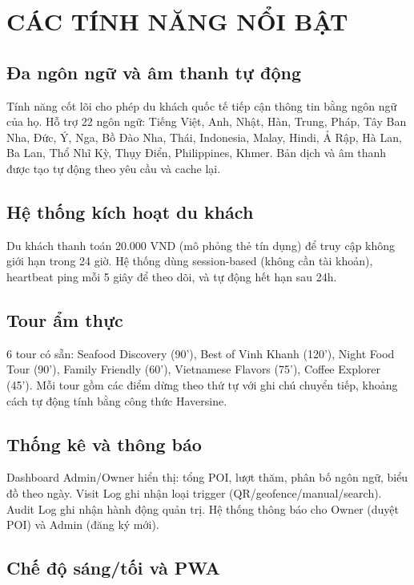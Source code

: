 \documentclass[a4paper,13pt]{report}
\begin{document}
\chapter{CÁC TÍNH NĂNG NỔI BẬT}

\section{Đa ngôn ngữ và âm thanh tự động}

Tính năng cốt lõi cho phép du khách quốc tế tiếp cận thông tin bằng ngôn ngữ của họ. Hỗ trợ 22 ngôn ngữ: Tiếng Việt, Anh, Nhật, Hàn, Trung, Pháp, Tây Ban Nha, Đức, Ý, Nga, Bồ Đào Nha, Thái, Indonesia, Malay, Hindi, Ả Rập, Hà Lan, Ba Lan, Thổ Nhĩ Kỳ, Thụy Điển, Philippines, Khmer. Bản dịch và âm thanh được tạo tự động theo yêu cầu và cache lại.

\section{Hệ thống kích hoạt du khách}

Du khách thanh toán 20.000 VND (mô phỏng thẻ tín dụng) để truy cập không giới hạn trong 24 giờ. Hệ thống dùng session-based (không cần tài khoản), heartbeat ping mỗi 5 giây để theo dõi, và tự động hết hạn sau 24h.

\section{Tour ẩm thực}

6 tour có sẵn: Seafood Discovery (90'), Best of Vinh Khanh (120'), Night Food Tour (90'), Family Friendly (60'), Vietnamese Flavors (75'), Coffee Explorer (45'). Mỗi tour gồm các điểm dừng theo thứ tự với ghi chú chuyển tiếp, khoảng cách tự động tính bằng công thức Haversine.

\section{Thống kê và thông báo}

Dashboard Admin/Owner hiển thị: tổng POI, lượt thăm, phân bố ngôn ngữ, biểu đồ theo ngày. Visit Log ghi nhận loại trigger (QR/geofence/manual/search). Audit Log ghi nhận hành động quản trị. Hệ thống thông báo cho Owner (duyệt POI) và Admin (đăng ký mới).

\section{Chế độ sáng/tối và PWA}
\end{document}
